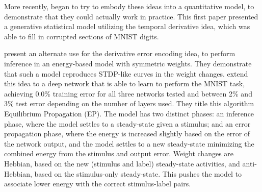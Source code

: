 More recently, \textcite{Bengio2015} began to try to embody these ideas
into a quantitative model,
to demonstrate that they could actually work in practice.
This first paper presented a generative statistical model
utilizing the temporal derivative idea,
which was able to fill in corrupted sections of MNIST digits.

\textcite{Bengio2017} present an alternate use for the
derivative error encoding idea,
to perform inference in an energy-based model with symmetric weights.
They demonstrate that such a model reproduces STDP-like curves
in the weight changes.
\textcite{Scellier2017} extend this idea to a deep network
that is able to learn to perform the MNIST task,
achieving 0.0\% training error for all three networks tested
and between 2\% and 3\% test error depending on the number of layers used.
They title this algorithm Equilibrium Propagation (EP).
The model has two distinct phases:
an inference phase, where the model settles to a steady-state
given a stimulus;
and an error propagation phase,
where the energy is increased slightly based on the error of the network output,
and the model settles to a new steady-state minimizing
the combined energy from the stimulus and output error.
Weight changes are Hebbian,
based on the new (stimulus and label) steady-state activities,
and anti-Hebbian, based on the stimulus-only steady-state.
This pushes the model to associate lower energy
with the correct stimulus-label pairs.

